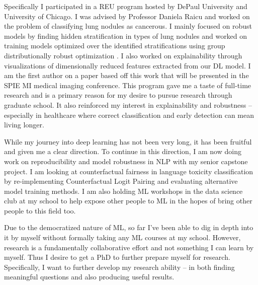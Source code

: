\documentclass[12pt]{article}
\begin{document}
 Specifically I participated in a REU program hosted by DePaul University and University of Chicago. I was advised by Professor Daniela Raicu and worked on the problem of classifying lung nodules as cancerous. I mainly focused on robust models by finding hidden stratification in types of lung nodules and worked on training models optimized over the identified stratifications using group distributionally robust optimization \cite{Sagawa*2020Distributionally}. I also worked on explainability through visualizations of dimensionally reduced features extracted from our DL model. I am the first author on a paper based off this work that will be presented in the SPIE MI medical imaging conference. This program gave me a taste of full-time research and is a primary reason for my desire to pursue research through graduate school.
It also reinforced my interest in explainability and robustness -- especially in healthcare where correct classification and early detection can mean living longer. 
 
While my journey into deep learning has not been very long, it has been fruitful and given me a clear direction.
To continue in this direction, I am now doing work on reproducibility and model robustness in NLP with my senior capstone project. I am looking at counterfactual fairness in language toxicity classification by re-implementing Counterfactual Logit Pairing \cite{garg2019counterfactual} and evaluating alternative model training methods. I am also holding ML workshops in the data science club at my school to help expose other people to ML in the hopes of bring other people to this field too.

Due to the democratized nature of ML, so far I've been able to dig in depth into it by myself without formally taking any ML courses at my school.
However, research is a fundamentally collaborative effort and not something I can learn by myself. Thus I desire to get a PhD to further prepare myself for research. Specifically, I want to further develop my research ability -- in both finding meaningful questions and also producing useful results.








\end{document}
